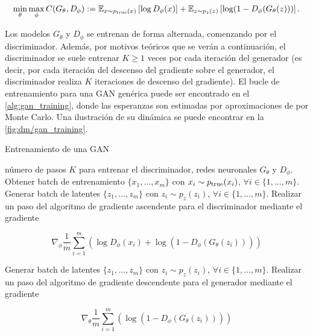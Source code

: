 \begin{equation}
    \label{eq:gan_objective}
	\min_\theta\max_\phi C(G_\theta, D_\phi) := \mathbb{E}_{x\sim p_{\operatorname{true}}(x)}\left[\log D_\phi(x)\right] + \mathbb{E}_{z\sim p_z(z)}\left[\log (1-D_\phi(G_\theta(z)))\right].
\end{equation}

Los modelos $G_\theta$ y $D_\phi$ se entrenan de forma alternada, comenzando por el discriminador. Además, por motivos teóricos que se verán a continuación, el discriminador se suele entrenar $K\geq 1$ veces por cada iteración del generador (es decir, por cada iteración del descenso del gradiente sobre el generador, el discriminador realiza $K$ iteraciones de descenso del gradiente). El bucle de entrenamiento para una GAN genérica puede ser encontrado en el \autoref{alg:gan_training}, donde las esperanzas son estimadas por aproximaciones de por Monte Carlo. Una ilustración de su dinámica se puede encontrar en la \autoref{fig:dm/gan_training}.

\begin{algorithm}
	\caption{Entrenamiento de una GAN}
    \label{alg:gan_training}
	\begin{algorithmic}[1]
		\Require número de pasos $K$ para entrenar el discriminador, redes neuronales $G_\theta$ y $D_\phi$.
		\State Obtener batch de entrenamiento $\{x_1,\ldots,x_m\}$ con $x_i\sim p_{\operatorname{true}}(x_i)$, $\forall i\in\{1,\ldots,m\}$.
		\State Generar batch de latentes $\{z_1,\ldots,z_m\}$ con $z_i\sim p_z(z_i)$, $\forall i\in\{1,\ldots,m\}$.
		\State Realizar un paso del algoritmo de gradiente ascendente para el discriminador mediante el gradiente

		\begin{equation*}
			\nabla_\phi \frac{1}{m}\sum_{i=1}^m \left(\log D_\phi(x_i) + \log(1-D_\phi(G_\theta(z_i)))\right)
		\end{equation*}

		\EndFor
		\State Generar batch de latentes $\{z_1,\ldots,z_m\}$ con $z_i\sim p_z(z_i)$, $\forall i\in\{1,\ldots,m\}$.
		\State Realizar un paso del algoritmo de gradiente descendente para el generador mediante el gradiente

		\begin{equation*}
			\nabla_\theta \frac{1}{m}\sum_{i=1}^m \left( \log(1-D_\phi(G_\theta(z_i)))\right)
		\end{equation*}

		\EndWhile
	\end{algorithmic}
\end{algorithm}

